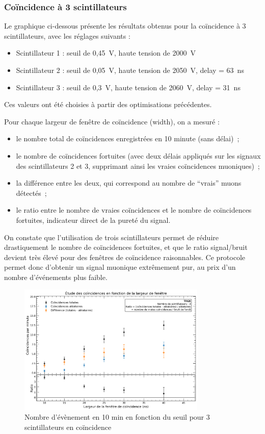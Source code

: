 \documentclass[a4paper,12pt,twoside]{article}
\begin{document}
\subsubsection{Coïncidence à 3 scintillateurs}

Le graphique ci-dessous présente les résultats obtenus pour la coïncidence à 3 scintillateurs, avec les réglages suivants :
\begin{itemize}
    \item Scintillateur 1 : seuil de 0{,}45~V, haute tension de 2000~V
    \item Scintillateur 2 : seuil de 0{,}05~V, haute tension de 2050~V, delay = 63~ns
    \item Scintillateur 3 : seuil de 0{,}3~V, haute tension de 2060~V, delay = 31~ns
\end{itemize}
Ces valeurs ont été choisies à partir des optimisations précédentes.

Pour chaque largeur de fenêtre de coïncidence (width), on a mesuré :
\begin{itemize}
    \item le nombre total de coïncidences enregistrées en 10 minute (sans délai)~;
    \item le nombre de coïncidences fortuites (avec deux délais appliqués sur les signaux des scintillateurs 2 et 3, supprimant ainsi les vraies coïncidences muoniques)~;
    \item la différence entre les deux, qui correspond au nombre de “vrais” muons détectés~;
    \item le ratio entre le nombre de vraies coïncidences et le nombre de coïncidences fortuites, indicateur direct de la pureté du signal.
\end{itemize}

On constate que l’utilisation de trois scintillateurs permet de réduire drastiquement le nombre de coïncidences fortuites, et que le ratio signal/bruit devient très élevé pour des fenêtres de coïncidence raisonnables. Ce protocole permet donc d’obtenir un signal muonique extrêmement pur, au prix d’un nombre d’événements plus faible.

\begin{figure}[!h]
    \centering
    \includegraphics[width=0.8\textwidth]{Images/Coincidences_3_Scintillateurs.png}
    \caption[Nombre d’évènement en 4min en fonction du seuil]{Nombre d’évènement en 10 min en fonction du seuil pour 3 scintillateurs en coïncidence}
    \label{fig:coincidences_3_scintillateurs}
  \end{figure}
\end{document}
